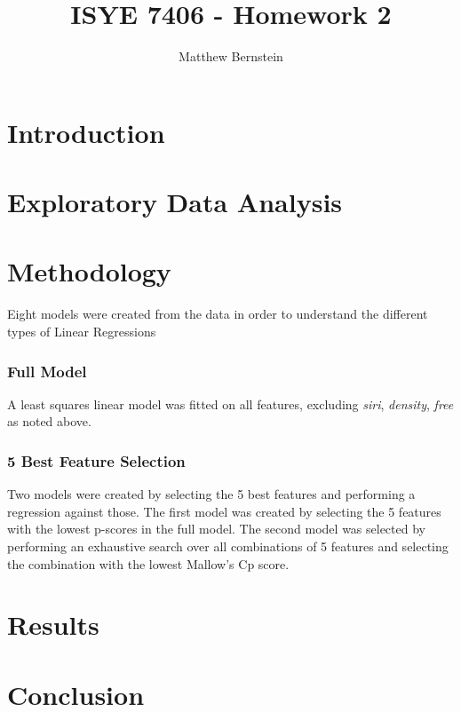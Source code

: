 \documentclass[12pt,letterpaper]{article}
\title{ISYE 7406 - Homework 2}
\author{Matthew Bernstein}
\begin{document}
\maketitle
\section*{Introduction}

\section*{Exploratory Data Analysis}

\section*{Methodology}

Eight models were created from the data in order to understand the different types of Linear Regressions

\subsubsection*{Full Model}
A least squares linear model was fitted on all features, excluding \textit{siri}, \textit{density}, \textit{free} as noted above.

\subsubsection*{5 Best Feature Selection}
Two models were created by selecting the 5 best features and performing a regression against those. The first model was created by selecting the 5 features with the lowest p-scores in the full model. The second model was selected by performing an exhaustive search over all combinations of 5 features and selecting the combination with the lowest Mallow's Cp score. 

\subsection{}

\section*{Results}

\section*{Conclusion}
\end{document}
